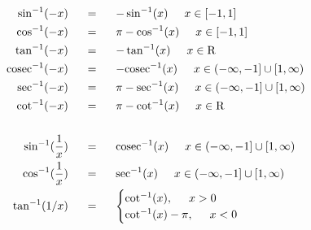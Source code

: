 \begin{align*}
\hspace{20mm} \sin^{-1}(-x)  \hspace{5mm} &= \hspace{5mm} -\sin^{-1}(x) \hspace{5mm} x \in [-1,1] \\
\hspace{20mm} \cos^{-1}(-x)  \hspace{5mm} &= \hspace{5mm} \pi - \cos^{-1}(x) \hspace{5mm} x \in [-1,1] \\
\hspace{20mm} \tan^{-1}(-x)  \hspace{5mm} &= \hspace{5mm} -\tan^{-1}(x) \hspace{5mm} x \in \mathrm{R} \\
\hspace{20mm} \mathrm{cosec}^{-1}(-x)  \hspace{5mm} &= \hspace{5mm} -\mathrm{cosec}^{-1}(x) \hspace{5mm} x \in (-\infty,-1] \cup [1,\infty)\\
\hspace{20mm} \mathrm{sec}^{-1}(-x)  \hspace{5mm} &= \hspace{5mm} \pi-\mathrm{sec}^{-1}(x) \hspace{5mm} x \in (-\infty,-1] \cup [1,\infty)\\
\hspace{20mm} \cot^{-1}(-x)  \hspace{5mm} &= \hspace{5mm} \pi -\cot^{-1}(x) \hspace{5mm} x \in \mathrm{R} \\ \\
\hspace{20mm} \sin^{-1}(\frac{1}{x})  \hspace{5mm} &= \hspace{5mm} \mathrm{cosec}^{-1}(x) \hspace{5mm} x \in (-\infty,-1] \cup [1,\infty)\\
\hspace{20mm} \cos^{-1}(\frac{1}{x})  \hspace{5mm} &= \hspace{5mm} \mathrm{sec}^{-1}(x) \hspace{5mm} x \in (-\infty,-1] \cup [1,\infty)\\
\tan^{-1}(1/x) \hspace{5mm} &= \hspace{5mm}
\begin{cases}
\cot^{-1}(x), \hspace{5mm}   x > 0 \\
\cot^{-1}(x) - \pi, \hspace{5mm} x < 0 \\
\end{cases}
\end{align*} 
